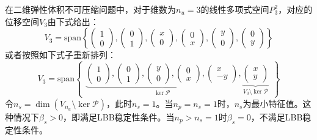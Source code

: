 在二维弹性体积不可压缩问题中，对于维数为$n_u=3$的线性多项式空间$P^2_3$，对应的位移空间$V_3$由下式给出：
\begin{equation}
    V_3 = \mathrm{span} \left \{
    \begin{pmatrix} 1 \\ 0 \end{pmatrix},
    \begin{pmatrix} 0 \\ 1 \end{pmatrix},
    \begin{pmatrix} x \\ 0 \end{pmatrix},
    \begin{pmatrix} 0 \\ x \end{pmatrix},
    \begin{pmatrix} y \\ 0 \end{pmatrix},
    \begin{pmatrix} 0 \\ y \end{pmatrix}
    \right \}
\end{equation}
或者按照如下式子重新排列：
\begin{equation}\label{ch_3:eq:base1}
    V_3 = \mathrm{span} 
    \begin{Bmatrix}
        \underbrace{
        \begin{pmatrix} 1 \\ 0 \end{pmatrix},
        \begin{pmatrix} 0 \\ 1 \end{pmatrix},
        \begin{pmatrix} y \\ 0 \end{pmatrix},
        \begin{pmatrix} 0 \\ x \end{pmatrix},
        \begin{pmatrix} x \\ -y \end{pmatrix}
        }_{\ker \mathcal P},
        \underbrace{
        \begin{pmatrix} x \\ y \end{pmatrix}
        }_{V_3\setminus \ker \mathcal P}
    \end{Bmatrix}
\end{equation}
令$n_s = \dim(V_{n_u}\setminus \ker \mathcal P)$，此时$n_s=1$。当$n_p=n_s=1$时，$n_s$为最小特征值。这种情况下$\beta_s>0$，即满足LBB稳定性条件。当$n_p>n_s=1$时$\beta_s=0$，不满足LBB稳定性条件。

